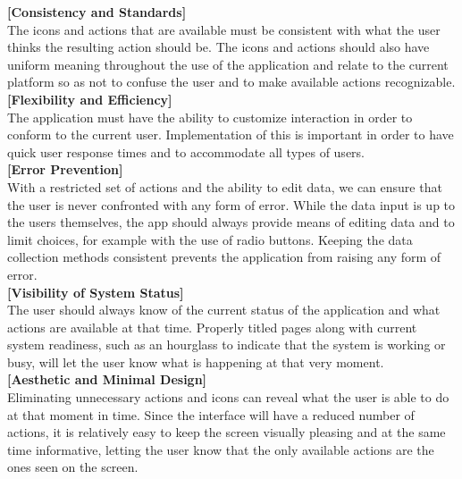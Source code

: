 \documentclass[pdftex,12pt,a4paper]{report}
\begin{document}
\noindent\textbf{[Consistency and Standards]}
\vspace{12pt}
\\The icons and actions that are available must be consistent with what the user thinks
the resulting action should be. The icons and actions should also have uniform
meaning throughout the use of the application and relate to the current platform
so as not to confuse the user and to make available actions recognizable.
\pagebreak
\\\textbf{[Flexibility and Efficiency]}
\vspace{12pt}
\\The application must have the ability to customize interaction in order to conform
to the current user. Implementation of this is important in order to have quick user
response times and to accommodate all types of users.
\vspace{12pt}
\\\textbf{[Error Prevention]}
\vspace{12pt}
\\With a restricted set of actions and the ability to edit data, we can ensure that
the user is never confronted with any form of error. While the data input is up to
the users themselves, the app should always provide means of editing data and to
limit choices, for example with the use of radio buttons. Keeping the data collection
methods consistent prevents the application from raising any form of error.
\vspace{12pt}
\\\textbf{[Visibility of System Status]}
\vspace{12pt}
\\The user should always know of the current status of the application and what
actions are available at that time. Properly titled pages along with current system
readiness, such as an hourglass to indicate that the system is working or busy, will
let the user know what is happening at that very moment.
\vspace{12pt}
\\\textbf{[Aesthetic and Minimal Design]}
\vspace{12pt}
\\Eliminating unnecessary actions and icons can reveal what the user is able to do at
that moment in time. Since the interface will have a reduced number of actions, it is
relatively easy to keep the screen visually pleasing and at the same time informative,
letting the user know that the only available actions are the ones seen on the screen.
\end{document}
